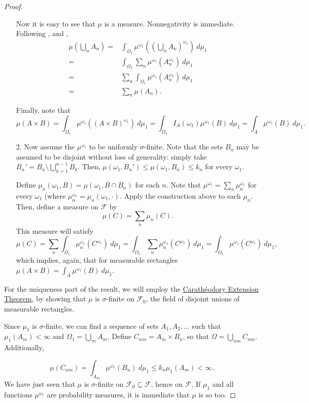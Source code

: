 \begin{proof}
\begin{enumerate}
          Now it is easy to see that \(\mu\) is a measure. Nonnegativity is immediate. Following , and ,
          \[
              \begin{aligned}
                  \mu\left(\bigcup_{n}A_n\right)=&     
                  \int_{\Omega_1}\mu^{\omega_1}\left(\left(\bigcup_{n}A_n\right)^{\omega_1}\right)~d\mu_1 \\
                  =& \int_{\Omega_1}\sum_{n} \mu^{\omega_1}\left(A_n^{\omega_1}\right)~d\mu_1\\
                  =& \sum_{n} \int_{\Omega_1}\mu^{\omega_1}(A_n^{\omega_1})~d\mu_1 \\
                  =& \sum_{n} \mu(A_n).
              \end{aligned}
          \]

      Finally, note that \[ \mu(A\times
          B)=\int_{\Omega_1}\mu^{\omega_1}(\left(A\times  B\right)^{\omega_1})~d\mu_1=\int_{\Omega_1}I_A(\omega_1)\mu^{\omega_1}(B)~d\mu_1=\int_{A}\mu^{\omega_1}(B)~d\mu_1.
      \]
      
  \item[2.] Now assume the \(\mu^{\omega_1}\) to be uniformly \(\sigma\)-finite. Note that the sets \(B_n\) may be assumed to be disjoint without loss of generality: simply take \(B_n'=B_n\setminus \bigcup_{k=1}^{n-1}B_k\). Then, \(\mu(\omega_1,B_n')\leq\mu(\omega_1,B_n)\leq k_n\) for every \(\omega_1\).

Define \(\mu_n(\omega_1,B)=\mu(\omega_1,B\cap B_n)\) for each \(n\). 
Note that \(\mu^{\omega_1}=\sum_{n} \mu_n^{\omega_1}\) for every \(\omega_1\) (where \(\mu_n^{\omega_1}=\mu_n(\omega_1,\cdot)\). Apply the construction above to each \(\mu_n\). Then,
define a measure on \(\mathcal{F}\) by
\[
\mu(C)=\sum_{n} \mu_n(C)
.\] 
This measure will satisfy
\[
    \mu(C)=\sum_{n}\int_{\Omega_1}\mu_n^{\omega_1}(C^{\omega_1})~d\mu_1
    =\int_{\Omega_1}\sum_{n}\mu_n^{\omega_1}(C^{\omega_1})~d\mu_1
    =\int_{\Omega_1}\mu^{\omega_1}(C^{\omega_1})~d\mu_1
,\]
which implies, again, that for measurable rectangles \(\mu(A\times B)=\int_{A}\mu^{\omega_1}(B)~d\mu_1\).
\end{enumerate}

For the uniqueness part of the result, we will employ the \hyperref[theorem:Caratheodory Extension]{Carathéodory Extension Theorem}, by showing that \(\mu\) is \(\sigma\)-finite on \(\mathcal{F}_0\), the field of disjoint unions of measurable rectangles.

Since \(\mu_1\) is \(\sigma\)-finite, we can find a sequence of sets \(A_1,A_2,\dots\) such that \(\mu_1(A_m)<\infty\) and \(\Omega_1=\bigcup_{m}A_m\). Define \(C_{nm}=A_m\times B_n\), so that \(\Omega=\bigcup_{nm}C_{nm}\). Additionally,

\[\mu(C_{nm})=\int_{A_m}\mu^{\omega_1}(B_n)~d\mu_1\leq k_n\mu_1(A_m)<\infty.\] 
We have just seen that \(\mu\) is \(\sigma\)-finite on \(\mathcal{F}_0\subseteq\mathcal{F}\), hence on \(\mathcal{F}\). If \(\mu_1\) and all functions \(\mu^{\omega_1}\) are probability measures, it is immediate that \(\mu\) is so too.
\end{proof}
